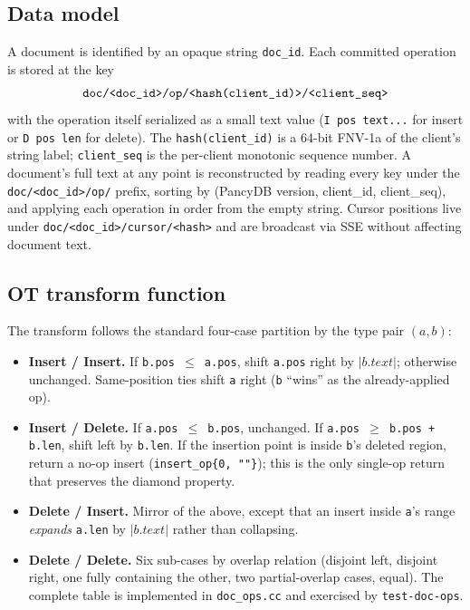 \documentclass[11pt]{article}
\newcommand{\code}[1]{\texttt{#1}}
\begin{document}
\subsection{Data model}

A document is identified by an opaque string \code{doc\_id}. Each committed operation is stored at the key
\[
  \text{\code{doc/<doc\_id>/op/<hash(client\_id)>/<client\_seq>}}
\]
with the operation itself serialized as a small text value (\code{I pos text...} for insert or \code{D pos len} for delete). The \code{hash(client\_id)} is a 64-bit FNV-1a of the client's string label; \code{client\_seq} is the per-client monotonic sequence number. A document's full text at any point is reconstructed by reading every key under the \code{doc/<doc\_id>/op/} prefix, sorting by (PancyDB version, client\_id, client\_seq), and applying each operation in order from the empty string. Cursor positions live under \code{doc/<doc\_id>/cursor/<hash>} and are broadcast via SSE without affecting document text.

\subsection{OT transform function}

The transform follows the standard four-case partition by the type pair $(a, b)$:

\begin{itemize}[leftmargin=*,itemsep=0.1em]
  \item \textbf{Insert / Insert.} If \code{b.pos $\le$ a.pos}, shift \code{a.pos} right by $|b.text|$; otherwise unchanged. Same-position ties shift \code{a} right (\code{b} ``wins'' as the already-applied op).
  \item \textbf{Insert / Delete.} If \code{a.pos $\le$ b.pos}, unchanged. If \code{a.pos $\ge$ b.pos + b.len}, shift left by \code{b.len}. If the insertion point is inside \code{b}'s deleted region, return a no-op insert (\code{insert\_op\{0, ""\}}); this is the only single-op return that preserves the diamond property.
  \item \textbf{Delete / Insert.} Mirror of the above, except that an insert inside \code{a}'s range \emph{expands} \code{a.len} by $|b.text|$ rather than collapsing.
  \item \textbf{Delete / Delete.} Six sub-cases by overlap relation (disjoint left, disjoint right, one fully containing the other, two partial-overlap cases, equal). The complete table is implemented in \code{doc\_ops.cc} and exercised by \code{test-doc-ops}.
\end{itemize}
\end{document}
